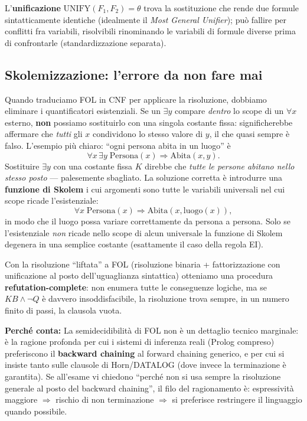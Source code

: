\documentclass[11pt,a4paper]{article}
\newcommand{\perche}[1]{\begin{nota}\textbf{Perché conta:} #1\end{nota}}
\begin{document}
L'\textbf{unificazione} $\text{UNIFY}(F_1,F_2)=\theta$ trova la sostituzione che rende due formule sintatticamente identiche (idealmente il \emph{Most General Unifier}); può fallire per conflitti fra variabili, risolvibili rinominando le variabili di formule diverse prima di confrontarle (standardizzazione separata).

\subsection{Skolemizzazione: l'errore da non fare mai}

Quando traduciamo FOL in CNF per applicare la risoluzione, dobbiamo eliminare i quantificatori esistenziali. Se un $\exists y$ compare \emph{dentro} lo scope di un $\forall x$ esterno, \textbf{non} possiamo sostituirlo con una singola costante fissa: significherebbe affermare che \emph{tutti} gli $x$ condividono lo stesso valore di $y$, il che quasi sempre è falso. L'esempio più chiaro: ``ogni persona abita in un luogo'' è
\[
\forall x\, \exists y\; \text{Persona}(x) \Rightarrow \text{Abita}(x,y).
\]
Sostituire $\exists y$ con una costante fissa $K$ direbbe che \emph{tutte le persone abitano nello stesso posto} --- palesemente sbagliato. La soluzione corretta è introdurre una \textbf{funzione di Skolem} i cui argomenti sono tutte le variabili universali nel cui scope ricade l'esistenziale:
\[
\forall x\; \text{Persona}(x) \Rightarrow \text{Abita}(x,\text{luogo}(x)),
\]
in modo che il luogo possa variare correttamente da persona a persona. Solo se l'esistenziale \emph{non} ricade nello scope di alcun universale la funzione di Skolem degenera in una semplice costante (esattamente il caso della regola EI).

Con la risoluzione ``liftata'' a FOL (risoluzione binaria + fattorizzazione con unificazione al posto dell'uguaglianza sintattica) otteniamo una procedura \textbf{refutation-complete}: non enumera tutte le conseguenze logiche, ma se $KB \wedge \neg Q$ è davvero insoddisfacibile, la risoluzione trova sempre, in un numero finito di passi, la clausola vuota.

\perche{La semidecidibilità di FOL non è un dettaglio tecnico marginale: è la ragione profonda per cui i sistemi di inferenza reali (Prolog compreso) preferiscono il \textbf{backward chaining} al forward chaining generico, e per cui si insiste tanto sulle clausole di Horn/DATALOG (dove invece la terminazione è garantita). Se all'esame vi chiedono ``perché non si usa sempre la risoluzione generale al posto del backward chaining'', il filo del ragionamento è: espressività maggiore $\Rightarrow$ rischio di non terminazione $\Rightarrow$ si preferisce restringere il linguaggio quando possibile.}
\end{document}
